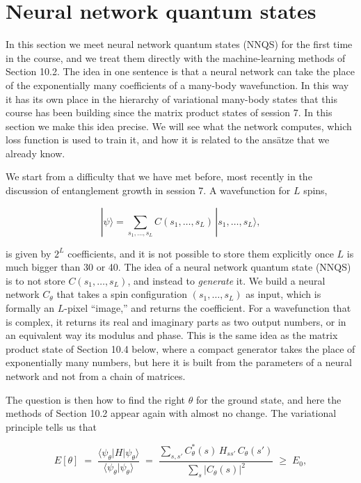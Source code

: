 

\section{Neural network quantum states}

In this section we meet neural network quantum states (NNQS) for the first time in the course, and
we treat them directly with the machine-learning methods of Section 10.2. The idea in one sentence
is that a neural network can take the place of the exponentially many coefficients of a many-body
wavefunction. In this way it has its own place in the hierarchy of variational many-body states
that this course has been building since the matrix product states of session 7. In this section
we make this idea precise. We will see what the network computes, which loss function is used to
train it, and how it is related to the ans\"atze that we already know.

We start from a difficulty that we have met before, most recently in the discussion of
entanglement growth in session 7. A wavefunction for $L$ spins,

\begin{equation}
|\psi\rangle = \sum_{s_1,\dots,s_L} C(s_1,\dots,s_L)\, |s_1,\dots,s_L\rangle,
\end{equation}

is given by $2^L$ coefficients, and it is not possible to store them explicitly once $L$ is much
bigger than 30 or 40. The idea of a neural network quantum state (NNQS) is to not store
$C(s_1,\dots,s_L)$, and instead to \emph{generate} it. We build a neural network $C_\theta$ that
takes a spin configuration $(s_1,\dots,s_L)$ as input, which is formally an $L$-pixel ``image,''
and returns the coefficient. For a wavefunction that is complex, it returns its real and imaginary
parts as two output numbers, or in an equivalent way its modulus and phase. This is the same idea as
the matrix product state of Section 10.4 below, where a compact generator takes the place of
exponentially many numbers, but here it is built from the parameters of a neural network and not
from a chain of matrices.

The question is then how to find the right $\theta$ for the ground state, and here the methods of
Section 10.2 appear again with almost no change. The variational principle tells us that

\begin{equation}
E[\theta] \;=\; \frac{\langle \psi_\theta | H | \psi_\theta\rangle}{\langle \psi_\theta|\psi_\theta\rangle} \;=\; \frac{\sum_{s,s'} C_\theta^*(s)\, H_{s s'}\, C_\theta(s')}{\sum_s |C_\theta(s)|^2} \;\geq\; E_0,
\end{equation}

